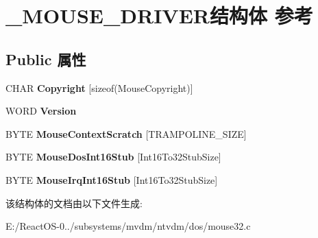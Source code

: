 \hypertarget{struct___m_o_u_s_e___d_r_i_v_e_r}{}\section{\+\_\+\+M\+O\+U\+S\+E\+\_\+\+D\+R\+I\+V\+E\+R结构体 参考}
\label{struct___m_o_u_s_e___d_r_i_v_e_r}
\subsection*{Public 属性}
\begin{DoxyCompactItemize}
\item 
\mbox{\label{struct___m_o_u_s_e___d_r_i_v_e_r_afcd48554f7ad9b53c216e655b5734d61}} 
C\+H\+AR {\bfseries Copyright} \mbox{[}sizeof(Mouse\+Copyright)\mbox{]}
\item 
\mbox{\label{struct___m_o_u_s_e___d_r_i_v_e_r_aeb53adf9f3322448c977d3633c7dde31}} 
W\+O\+RD {\bfseries Version}
\item 
\mbox{\label{struct___m_o_u_s_e___d_r_i_v_e_r_a6e14b050cac4ed5b1deb3737abf256ea}} 
B\+Y\+TE {\bfseries Mouse\+Context\+Scratch} \mbox{[}T\+R\+A\+M\+P\+O\+L\+I\+N\+E\+\_\+\+S\+I\+ZE\mbox{]}
\item 
\mbox{\label{struct___m_o_u_s_e___d_r_i_v_e_r_a16bd9533b316e0f54f9cc75c66f1d5ed}} 
B\+Y\+TE {\bfseries Mouse\+Dos\+Int16\+Stub} \mbox{[}Int16\+To32\+Stub\+Size\mbox{]}
\item 
\mbox{\label{struct___m_o_u_s_e___d_r_i_v_e_r_a7ac711877c993f23d14156980e7d3d2a}} 
B\+Y\+TE {\bfseries Mouse\+Irq\+Int16\+Stub} \mbox{[}Int16\+To32\+Stub\+Size\mbox{]}
\end{DoxyCompactItemize}


该结构体的文档由以下文件生成\+:\begin{DoxyCompactItemize}
\item 
E\+:/\+React\+O\+S-\/0../subsystems/mvdm/ntvdm/dos/mouse32.\+c\end{DoxyCompactItemize}
